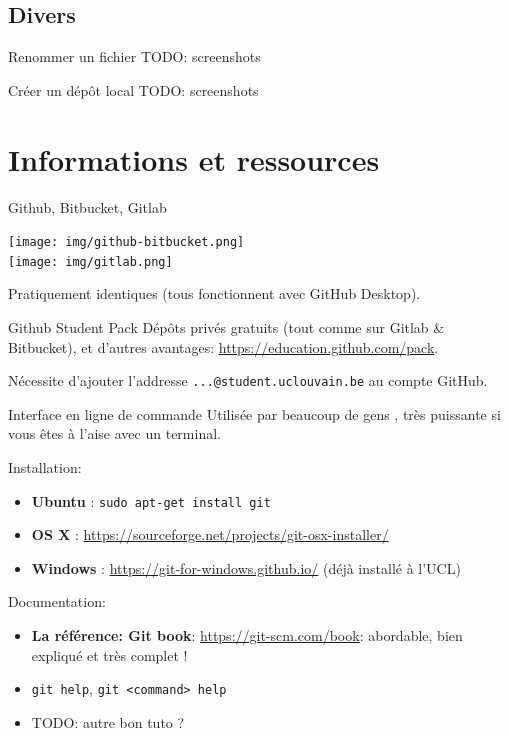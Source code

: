 \documentclass{beamer}
\begin{document}
\subsection{Divers}

\begin{frame}{Renommer un fichier}
    TODO: screenshots
\end{frame}

\begin{frame}{Créer un dépôt local}
    TODO: screenshots
\end{frame}

\section{Informations et ressources}

\begin{frame}{Github, Bitbucket, Gitlab}
    \begin{center}
        \texttt{[image: img/github-bitbucket.png]} \\
        \texttt{[image: img/gitlab.png]}
    \end{center}
    Pratiquement identiques (tous fonctionnent avec GitHub Desktop).
\end{frame}

\begin{frame}{Github Student Pack}
    Dépôts privés gratuits (tout comme sur Gitlab \& Bitbucket), et d'autres avantages: \url{https://education.github.com/pack}.

    Nécessite d'ajouter l'addresse \texttt{...@student.uclouvain.be} au compte
    GitHub.
\end{frame}

\begin{frame}{Interface en ligne de commande}
    Utilisée par beaucoup de gens , très puissante si vous êtes à l'aise avec
    un terminal.

    Installation:
    \begin{itemize}
        \item \textbf{Ubuntu} : \texttt{sudo apt-get install git}
        \item \textbf{OS X} : \url{https://sourceforge.net/projects/git-osx-installer/}
        \item \textbf{Windows} : \url{https://git-for-windows.github.io/} (déjà
            installé à l'UCL)
    \end{itemize}

    Documentation:
    \begin{itemize}
        \item \textbf{La référence: Git book}: \url{https://git-scm.com/book}:
            abordable, bien expliqué et très complet !
        \item \texttt{git help}, \texttt{git <command> help}
        \item TODO: autre bon tuto ?
    \end{itemize}
\end{frame}
\end{document}
